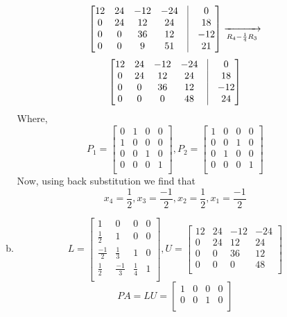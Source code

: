 \begin{enumerate}[1)]
\begin{enumerate}[(a)]
\[\begin{bmatrix}
12 & 24 & -12 & -24 & \vline & 0\\
0 & 24 & 12 & 24 & \vline & 18\\
0 & 0 & 36 & 12 & \vline & -12\\
0 & 0 & 9 & 51 & \vline & 21\\
\end{bmatrix}
\xrightarrow[R_4-\frac{1}{4}R_3]{}
\]
\[
\begin{bmatrix}
12 & 24 & -12 & -24 & \vline & 0\\
0 & 24 & 12 & 24 & \vline & 18\\
0 & 0 & 36 & 12 & \vline & -12\\
0 & 0 & 0 & 48 & \vline & 24 \\
\end{bmatrix}
\]
Where, 
\[
P_1
=
\begin{bmatrix}
0 & 1 & 0& 0\\
1 & 0 & 0 & 0\\
0 & 0 & 1 & 0\\
0 & 0 & 0 & 1\\
\end{bmatrix}
, P_2=
\begin{bmatrix}
1 & 0 & 0 & 0\\
0 & 0 & 1 & 0\\
0 & 1 & 0& 0\\
0 & 0 & 0 & 1\\
\end{bmatrix}
\]
Now, using back substitution we find that $$ x_4=\frac{1}{2}, x_3=\frac{-1}{2},  x_2=\frac{1}{2}, x_1=\frac{-1}{2}$$
	\item 
	\[
	L=
	\begin{bmatrix}
	1 & 0 & 0 & 0\\
	\frac{1}{2} & 1 & 0 & 0\\
	\frac{-1}{2} & \frac{1}{3} & 1 & 0\\
	\frac{1}{2} & \frac{-1}{3} & \frac{1}{4}& 1\\
 	\end{bmatrix}
	, U=\begin{bmatrix}
12 & 24 & -12 & -24  \\
0 & 24 & 12 & 24 \\
0 & 0 & 36 & 12 \\
0 & 0 & 0 & 48  \\
\end{bmatrix}
\]
\[
PA=LU=
	\begin{bmatrix}
	1 & 0 & 0& 0\\
0 & 0 & 1 & 0\\

\end{bmatrix}\]
\end{enumerate}
\end{enumerate}
